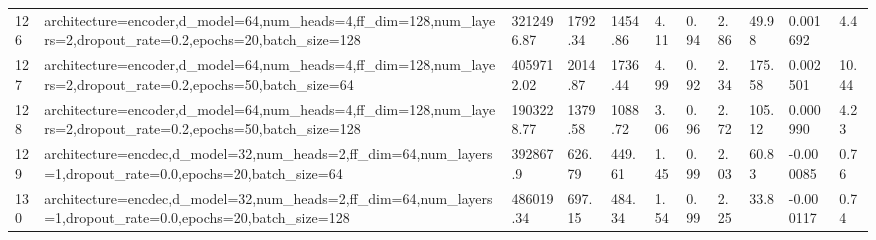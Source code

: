 \begin{longtable}{C{0.8cm} L{2cm} C{1.15cm} C{1.15cm} C{1.15cm} C{1.15cm} C{0.85cm} C{1.25cm} C{1.2cm} C{1.5cm} C{1.0cm}}
126 & architecture=encoder,\newline d\_model=64,\newline num\_heads=4,\newline ff\_dim=128,\newline num\_layers=2,\newline dropout\_rate=0.2,\newline epochs=20,\newline batch\_size=128 & 3212496.87 & 1792.34 & 1454.86 & 4.11 & 0.94 & 2.86 & 49.98 & 0.001692 & 4.4 \\
127 & architecture=encoder,\newline d\_model=64,\newline num\_heads=4,\newline ff\_dim=128,\newline num\_layers=2,\newline dropout\_rate=0.2,\newline epochs=50,\newline batch\_size=64 & 4059712.02 & 2014.87 & 1736.44 & 4.99 & 0.92 & 2.34 & 175.58 & 0.002501 & 10.44 \\
128 & architecture=encoder,\newline d\_model=64,\newline num\_heads=4,\newline ff\_dim=128,\newline num\_layers=2,\newline dropout\_rate=0.2,\newline epochs=50,\newline batch\_size=128 & 1903228.77 & 1379.58 & 1088.72 & 3.06 & 0.96 & 2.72 & 105.12 & 0.000990 & 4.23 \\
129 & architecture=encdec,\newline d\_model=32,\newline num\_heads=2,\newline ff\_dim=64,\newline num\_layers=1,\newline dropout\_rate=0.0,\newline epochs=20,\newline batch\_size=64 & 392867.9 & 626.79 & 449.61 & 1.45 & 0.99 & 2.03 & 60.83 & -0.000085 & 0.76 \\
130 & architecture=encdec,\newline d\_model=32,\newline num\_heads=2,\newline ff\_dim=64,\newline num\_layers=1,\newline dropout\_rate=0.0,\newline epochs=20,\newline batch\_size=128 & 486019.34 & 697.15 & 484.34 & 1.54 & 0.99 & 2.25 & 33.8 & -0.000117 & 0.74 \\

\end{longtable}
